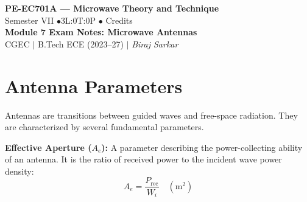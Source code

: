 \documentclass[12pt,a4paper]{article}
\begin{document}

\begin{center}
  {\LARGE\bfseries\color{myred} PE-EC701A --- Microwave Theory and Technique}\\[5pt]
  {\normalsize\color{mydark} Semester VII \quad$\bullet$\quad 3L:0T:0P \quad$\bullet$ Credits}\\[3pt]
  {\normalsize\color{myteal}\textbf{Module 7 Exam Notes: Microwave Antennas}}\\[3pt]
  {\small\color{mydark} CGEC \;$|$\; B.Tech ECE (2023--27) \;$|$\; \textit{Biraj Sarkar}}
\end{center}
\vspace{2pt}
\noindent{\color{myred}\rule{\linewidth}{1.5pt}}
\vspace{2pt}

\hypersetup{linkcolor=mydark}
\tableofcontents
\hypersetup{linkcolor=myteal}
\newpage

\section{Antenna Parameters}

Antennas are transitions between guided waves and free-space radiation. They are characterized by several fundamental parameters.

\begin{tcolorbox}[defbox]
\textbf{Effective Aperture ($A_e$):} A parameter describing the power-collecting ability of an antenna. It is the ratio of received power to the incident wave power density:
\begin{equation}
  A_e = \frac{P_{\text{rec}}}{W_i} \quad (\text{m}^2)
\end{equation}
\end{tcolorbox}
\end{document}
